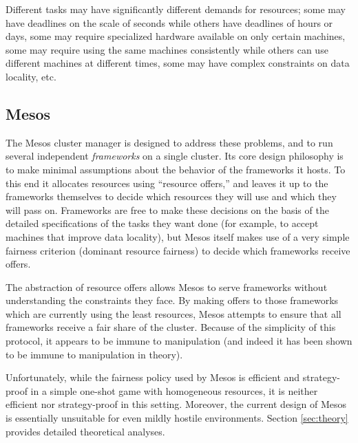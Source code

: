 \documentclass{acm_proc_article-sp}
\begin{document}
Different tasks may have significantly different demands for resources; some may
have deadlines on the scale of seconds while others have deadlines of hours or
days, some may require specialized hardware available on only certain machines,
some may require using the same machines consistently while others can use
different machines at different times, some may have complex constraints on data
locality, etc. 

\subsection{Mesos}
The Mesos cluster manager is designed to address these problems, and to run
several independent \emph{frameworks} on a single cluster. Its core design philosophy
is to make minimal assumptions about the behavior of the frameworks it hosts. To
this end it allocates resources using ``resource offers,'' and leaves it up to the
frameworks themselves to decide which resources they will use and which they
will pass on. Frameworks are free to make these decisions on the basis of the
detailed specifications of the tasks they want done (for example, to accept
machines that improve data locality), but Mesos itself makes use of a very
simple fairness criterion (dominant resource fairness) to decide which frameworks receive offers.

The abstraction of resource offers allows Mesos to serve frameworks without
understanding the constraints they face. By making offers to those frameworks
which are currently using the least resources, Mesos attempts to ensure that all
frameworks receive a fair share of the cluster. Because of the simplicity of
this protocol, it appears to be immune to manipulation (and indeed it has been
shown to be immune to manipulation in theory).

Unfortunately, while the fairness policy used by Mesos is efficient and
strategy-proof in a simple one-shot game with homogeneous resources, it is
neither efficient nor strategy-proof in this setting. 
Moreover, the
current design of Mesos is essentially unsuitable for even mildly hostile
environments. Section \ref{sec:theory} provides detailed theoretical analyses.
\end{document}
